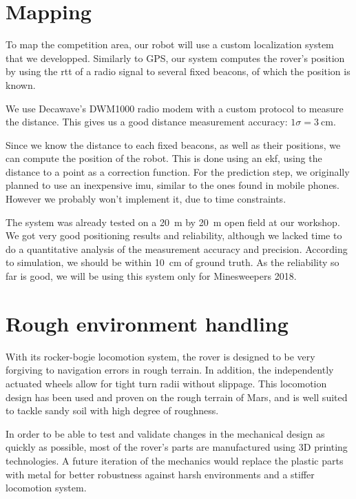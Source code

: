 \section{Mapping}

To map the competition area, our robot will use a custom localization system that we developped.
Similarly to GPS, our system computes the rover's position by using the \gls{rtt} of a radio signal to several fixed beacons, of which the position is known.

We use Decawave's DWM1000 radio modem with a custom protocol to measure the distance.
This gives us a good distance measurement accuracy: $1 \sigma = \SI{3}{\centi\meter}$.

Since we know the distance to each fixed beacons, as well as their positions, we can compute the position of the robot.
This is done using an \gls{ekf}, using the distance to a point as a correction function.
For the prediction step, we originally planned to use an inexpensive \gls{imu}, similar to the ones found in mobile phones.
However we probably won't implement it, due to time constraints.

The system was already tested on a \SI{20}{\meter} by \SI{20}{\meter} open field at our workshop.
We got very good positioning results and reliability, although we lacked time to do a quantitative analysis of the measurement accuracy and precision.
According to simulation, we should be within \SI{10}{\centi\meter} of ground truth.
As the reliability so far is good, we will be using this system only for Minesweepers 2018.


\section{Rough environment handling}
With its rocker-bogie locomotion system, the rover is designed to be very forgiving to navigation errors in rough terrain.
In addition, the independently actuated wheels allow for tight turn radii without slippage.
This locomotion design has been used and proven on the rough terrain of Mars, and is well suited to tackle sandy soil with high degree of roughness.

In order to be able to test and validate changes in the mechanical design as quickly as possible, most of the rover's parts are manufactured using 3D printing technologies.
A future iteration of the mechanics would replace the plastic parts with metal for better robustness against harsh environments and a stiffer locomotion system.

